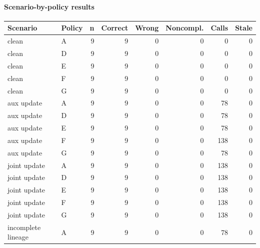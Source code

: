 \documentclass{article}
\begin{document}
\noindent\begin{minipage}{\linewidth}

\paragraph{Scenario-by-policy results}

\begin{center}{\footnotesize\setlength{\tabcolsep}{3pt}\begin{tabular}{llrrrrrr}\hline

Scenario & Policy & n & Correct & Wrong & Noncompl. & Calls & Stale \\\hline

clean & A & 9 & 9 & 0 & 0 & 0 & 0 \\

clean & D & 9 & 9 & 0 & 0 & 0 & 0 \\

clean & E & 9 & 9 & 0 & 0 & 0 & 0 \\

clean & F & 9 & 9 & 0 & 0 & 0 & 0 \\

clean & G & 9 & 9 & 0 & 0 & 0 & 0 \\

aux update & A & 9 & 9 & 0 & 0 & 78 & 0 \\

aux update & D & 9 & 9 & 0 & 0 & 78 & 0 \\

aux update & E & 9 & 9 & 0 & 0 & 78 & 0 \\

aux update & F & 9 & 9 & 0 & 0 & 138 & 0 \\

aux update & G & 9 & 9 & 0 & 0 & 78 & 0 \\

joint update & A & 9 & 9 & 0 & 0 & 138 & 0 \\

joint update & D & 9 & 9 & 0 & 0 & 138 & 0 \\

joint update & E & 9 & 9 & 0 & 0 & 138 & 0 \\

joint update & F & 9 & 9 & 0 & 0 & 138 & 0 \\

joint update & G & 9 & 9 & 0 & 0 & 138 & 0 \\

incomplete lineage & A & 9 & 9 & 0 & 0 & 78 & 0 \\


\end{tabular}}
\end{center}
\end{minipage}
\end{document}

